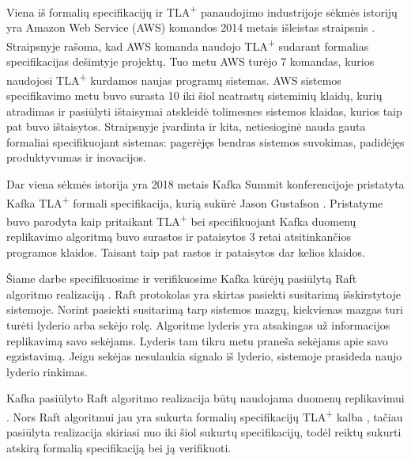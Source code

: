 \documentclass{VUMIFPSmagistrinis}
\begin{document}
		Viena iš formalių specifikacijų ir TLA\textsuperscript{+} panaudojimo industrijoje sėkmės istorijų yra Amazon Web Service (AWS) komandos 2014 metais išleistas straipsnis \cite{newcombe2014use}.
		Straipsnyje rašoma,  kad AWS komanda naudojo TLA\textsuperscript{+} sudarant formalias specifikacijas dešimtyje projektų. Tuo metu AWS turėjo 7 komandas, kurios naudojosi TLA\textsuperscript{+} kurdamos naujas programų sistemas.
		AWS sistemos specifikavimo metu buvo surasta 10 iki šiol neatrastų sisteminių klaidų, kurių atradimas ir pasiūlyti ištaisymai atskleidė tolimesnes sistemos klaidas, kurios taip pat buvo ištaisytos.
		Straipsnyje įvardinta ir kita, netiesioginė nauda gauta formaliai specifikuojant sistemas: pagerėjęs bendras sistemos suvokimas, padidėjęs produktyvumas ir inovacijos.
		

		Dar viena sėkmės istorija yra 2018 metais Kafka Summit konferencijoje pristatyta Kafka TLA\textsuperscript{+} formali specifikacija, kurią sukūrė Jason Gustafson \cite{kfkTla}.
		Pristatyme buvo parodyta kaip pritaikant TLA\textsuperscript{+} bei specifikuojant Kafka duomenų replikavimo algoritmą buvo surastos ir pataisytos 3 retai atsitinkančios programos klaidos.
		Taisant taip pat rastos ir pataisytos dar kelios klaidos.


		Šiame darbe specifikuosime ir verifikuosime Kafka kūrėjų pasiūlytą Raft algoritmo \cite{10.1145/2723872.2723876} realizaciją \cite{raftimpl}.
		Raft protokolas yra skirtas pasiekti susitarimą išskirstytoje sistemoje.
		Norint pasiekti susitarimą tarp sistemos mazgų, kiekvienas mazgas turi turėti lyderio arba sekėjo rolę.
		Algoritme lyderis yra atsakingas už informacijos replikavimą savo sekėjams.
		Lyderis tam tikru metu praneša sekėjams apie savo egzistavimą.
		Jeigu sekėjas nesulaukia signalo iš lyderio, sistemoje prasideda naujo lyderio rinkimas.
		
		
		Kafka pasiūlyto Raft algoritmo realizacija būtų naudojama duomenų replikavimui \cite{raftimpl}.
		Nors Raft algoritmui jau yra sukurta formalių specifikacijų TLA\textsuperscript{+} kalba \cite{rafttla}, tačiau pasiūlyta realizacija skiriasi nuo iki šiol sukurtų specifikacijų, todėl reiktų sukurti atskirą formalią specifikaciją bei ją verifikuoti.
\end{document}
